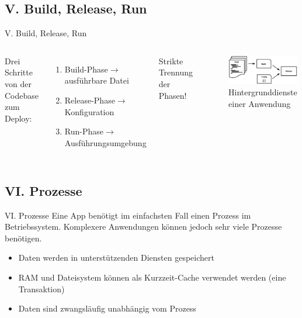 \documentclass{beamer}
\begin{document}
			\subsection{V. Build, Release, Run}
				\begin{frame}{V. Build, Release, Run}
					\begin{columns}
					Drei Schritte von der Codebase zum Deploy:
					\begin{enumerate}
						\item Build-Phase\newline $\rightarrow$ ausführbare Datei
						\item Release-Phase\newline $\rightarrow$ Konfiguration
						\item Run-Phase\newline $\rightarrow$ Ausführungsumgebung
					\end{enumerate}
					Strikte Trennung der Phasen!
					\begin{figure}
						\includegraphics[width=\textwidth]{release.png}
						\caption{Hintergrunddienste einer Anwendung \cite{factor-release}}
					\end{figure}
					\end{columns}
				\end{frame}
			\subsection{VI. Prozesse}
				\begin{frame}{VI. Prozesse}
					Eine App benötigt im einfachsten Fall einen Prozess im Betriebssystem. Komplexere Anwendungen können jedoch sehr viele Prozesse benötigen.
					\begin{itemize}
						\item Daten werden in unterstützenden Diensten gespeichert
						\item RAM und Dateisystem können als Kurzzeit-Cache verwendet werden (eine Transaktion)
						\item Daten sind zwangsläufig unabhängig vom Prozess
					\end{itemize}
				\end{frame}
\end{document}
